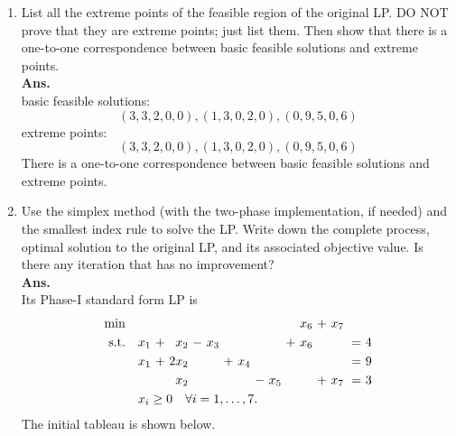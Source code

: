 \documentclass[12pt]{article}
\begin{document}
\begin{enumerate}
\begin{enumerate}
                  \item List all the extreme points of the feasible region of the original LP. DO NOT prove that they are extreme points; just list them. Then show that there is a one-to-one correspondence between basic feasible solutions and extreme points.\\
                        \textbf{Ans.}\\
                        basic feasible solutions:
                        \begin{equation*}
                              (3,3,2,0,0), (1,3,0,2,0),(0,9,5,0,6)
                        \end{equation*}
                        extreme points:
                        \begin{equation*}
                              (3,3,2,0,0), (1,3,0,2,0),(0,9,5,0,6)
                        \end{equation*}
                        There is a one-to-one correspondence between basic feasible solutions and extreme points.
                  \item Use the simplex method (with the two-phase implementation, if needed) and the smallest index rule to solve the LP. Write down the complete process, optimal solution to the original LP, and its associated objective value. Is there any iteration that has no improvement?\\
                        \textbf{Ans.}\\
                        Its Phase-I standard form LP is
                        \begin{equation*}
                              \begin{alignedat}{14}
                                    \min \quad       &  &  &  &  &&&&&&&&x_6&\ +\ &x_7            \\
                                    \text{s.t.} \quad &  & x_1 & \ +\  & x_2  & \ -\  & x_3 &&&&&\ +\ &x_6&&& \ =\  & 4 \\
                                    && x_1 & \ +\  & 2x_2 & & &\ +\  & x_4 & & &&&&& \ =\  & 9\\
                                    && & & x_2 & & & & & \ -\  & x_5 &&&\ +\ &x_7& \ =\  & 3 \\
                                    & \mathrlap{x_i \geq 0\quad \forall i=1,\dots ,7.}
                              \end{alignedat}
                        \end{equation*}
                        The initial tableau is shown below.

\end{enumerate}
\end{enumerate}
\end{document}
